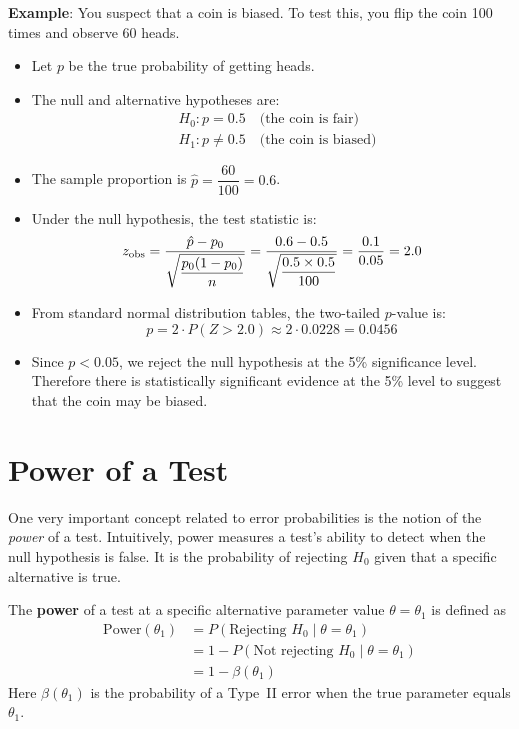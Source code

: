 \documentclass[twoside]{book}
\begin{document}
\textbf{Example}: You suspect that a coin is biased. To test this, you flip the coin 100 times and observe 60 heads.

\begin{itemize}
	\item Let \(p\) be the true probability of getting heads.
	\item The null and alternative hypotheses are:
	\begin{align*}
	&H_0: p = 0.5 \quad \text{(the coin is fair)} \\
	&H_1: p \neq 0.5 \quad \text{(the coin is biased)}
	\end{align*}
	\item The sample proportion is \(\hat{p} = \dfrac{60}{100} = 0.6\).

	\item Under the null hypothesis, the test statistic is:
	\[
	z_{\rm obs} = \frac{\hat{p} - p_0}{\sqrt{\dfrac{p_0(1 - p_0)}{n}}}
	= \frac{0.6 - 0.5}{\sqrt{\dfrac{0.5 \times 0.5}{100}}}
	= \frac{0.1}{0.05} = 2.0
	\]

	\item From standard normal distribution tables, the two-tailed \(p\)-value is:
	\[
	p = 2 \cdot P(Z > 2.0) \approx 2 \cdot 0.0228 = 0.0456
	\]

	\item Since \(p < 0.05\), we reject the null hypothesis at the 5\% significance level. Therefore there is statistically significant evidence at the 5\% level to suggest that the coin may be biased.
\end{itemize}


\section{Power of a Test}

One very important concept related to error probabilities is the notion of the \emph{power} of a test. Intuitively, power measures a test's ability to detect when the null hypothesis is false. It is the probability of rejecting $ H_0 $ given that a speciﬁc alternative is true.

\begin{textbox}
	The \textbf{power} of a test at a specific alternative parameter value $\theta=\theta_1$ is defined as
	\begin{align*}
	\mathrm{Power}(\theta_1) &= P(\text{Rejecting }H_0\mid \theta = \theta_1)\\
	&=1-P(\text{Not rejecting }H_0\mid \theta = \theta_1)\\
	& = 1 - \beta(\theta_1)
	\end{align*}
Here $\beta(\theta_1)$ is the probability of a Type~II error when the true parameter equals $\theta_1$.
\end{textbox}
\bigskip
\end{document}
